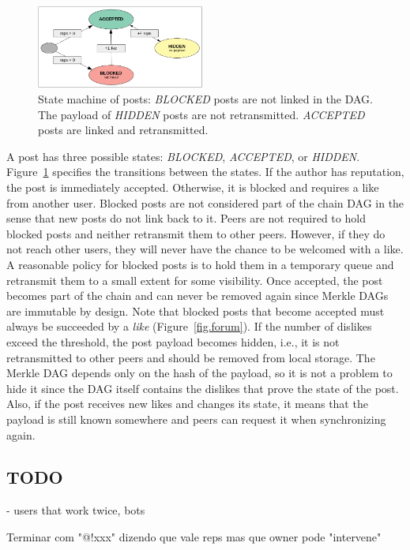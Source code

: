 \documentclass[10pt,journal,compsoc]{IEEEtran}
\begin{document}
\begin{figure}[ht]
\centering
\includegraphics[width=0.49\textwidth]{state.png}
\caption{
    State machine of posts:
    \emph{BLOCKED} posts are not linked in the DAG.
    The payload of \emph{HIDDEN} posts are not retransmitted.
    \emph{ACCEPTED} posts are linked and retransmitted.
}
\label{fig.state}
\end{figure}

A post has three possible states: \emph{BLOCKED}, \emph{ACCEPTED}, or
\emph{HIDDEN}.
Figure~\ref{fig.state} specifies the transitions between the states.
%
If the author has reputation, the post is immediately accepted.
Otherwise, it is blocked and requires a like from another user.
Blocked posts are not considered part of the chain DAG in the sense that new
posts do not link back to it.
%
Peers are not required to hold blocked posts and neither retransmit them to
other peers.
However, if they do not reach other users, they will never have the chance to
be welcomed with a like.
A reasonable policy for blocked posts is to hold them in a temporary queue and
retransmit them to a small extent for some visibility.
%
Once accepted, the post becomes part of the chain and can never be removed
again since Merkle DAGs are immutable by design.
Note that blocked posts that become accepted must always be succeeded by a
\emph{like} (Figure~\ref{fig.forum}).
%
If the number of dislikes exceed the threshold, the post payload becomes
hidden, i.e., it is not retransmitted to other peers and should be removed from
local storage.
The Merkle DAG depends only on the hash of the payload, so it is not a problem
to hide it since the DAG itself contains the dislikes that prove the state of
the post.
Also, if the post receives new likes and changes its state, it means that the
payload is still known somewhere and peers can request it when synchronizing
again.

\subsection{TODO}

- users that work twice, bots

Terminar com "@!xxx" dizendo que vale reps mas que owner pode "intervene"
\end{document}
